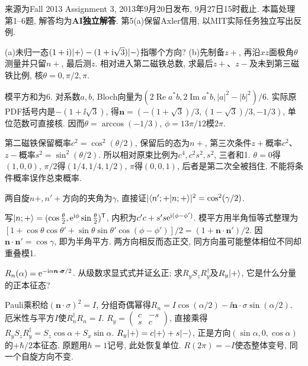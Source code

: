 来源为Fall 2013 Assignment 3, 2013年9月20日发布, 9月27日15时截止. 本篇处理第1--6题, 解答均为\textbf{AI独立解答}. 第5(a)保留Axler信用, 以MIT实际任务独立写出反例.
\begin{exercise}
(a)未归一态$(1+\mathrm i)\lvert +\rangle-(1+\mathrm i\sqrt3)\lvert -\rangle$指哪个方向? (b)先制备$z+$, 再沿$xz$面极角$\theta$测量并只留$n+$, 最后测$z$. 相对进入第二磁铁总数, 求最后$z+$、$z-$及未到第三磁铁比例, 核$\theta=0,\pi/2,\pi$.
\end{exercise}
\begin{solution}
模平方和为6. 对系数$a,b$, Bloch向量为$(2\operatorname{Re}a^*b,2\operatorname{Im}a^*b,|a|^2-|b|^2)/6$. 实际原PDF括号内是$-(1+\ii\sqrt3)$, 得$\boldsymbol n=(-(1+\sqrt3)/3,(1-\sqrt3)/3,-1/3)$, 单位范数可直接核. 因而$\theta=\arccos(-1/3)$, $\phi=13\pi/12$模$2\pi$.

第二磁铁保留概率$c^2=\cos^2(\theta/2)$, 保留后的态为$n+$, 第三次条件$z+$概率$c^2$、$z-$概率$s^2=\sin^2(\theta/2)$. 所以相对原束比例为$c^4,c^2s^2,s^2$, 三者和1. $\theta=0$得$(1,0,0)$, $\pi/2$得$(1/4,1/4,1/2)$, $\pi$得$(0,0,1)$, 后者是第二次全被挡住, 不能将条件概率误作总束概率.
\end{solution}
\begin{exercise}
两自旋$n+,n'+$方向的夹角为$\gamma$, 直接证$|\langle n';+\vert n;+\rangle|^2=\cos^2(\gamma/2)$.
\end{exercise}
\begin{solution}
写$\lvert n;+\rangle=(\cos\frac\theta2,\mathrm e^{\mathrm i\phi}\sin\frac\theta2)^{\mathsf T}$, 内积为$c'c+s's\mathrm e^{\mathrm i(\phi-\phi')}$. 模平方用半角恒等式整理为$[1+\cos\theta\cos\theta'+\sin\theta\sin\theta'\cos(\phi-\phi')]/2=(1+\boldsymbol n\cdot\boldsymbol n')/2$. 因$\boldsymbol n\cdot\boldsymbol n'=\cos\gamma$, 即为半角平方. 两方向相反而态正交, 同方向虽可能整体相位不同却重叠模1.
\end{solution}
\begin{exercise}
$R_n(\alpha)=\mathrm e^{-\mathrm i\alpha\boldsymbol n\cdot\boldsymbol\sigma/2}$. 从级数求显式式并证幺正; 求$R_yS_zR_y^\dagger$及$R_y\lvert +\rangle$, 它是什么分量的正本征态?
\end{exercise}
\begin{solution}
Pauli乘积给$(\boldsymbol n\cdot\sigma)^2=I$, 分组奇偶幂得$R_n=I\cos(\alpha/2)-\ii\boldsymbol n\cdot\sigma\sin(\alpha/2)$. 厄米性与平方$I$使$R_n^\dagger R_n=I$. $R_y=\begin{pmatrix}c&-s\\s&c\end{pmatrix}$, 直接乘得$R_yS_zR_y^\dagger=S_z\cos\alpha+S_x\sin\alpha$. $R_y\lvert +\rangle=c\lvert +\rangle+s\lvert -\rangle$, 正是方向$(\sin\alpha,0,\cos\alpha)$的$+\hbar/2$本征态. 原题用$\hbar=1$记号, 此处恢复单位. $R(2\pi)=-I$使态整体变号, 同一个自旋方向不变.
\end{solution}

